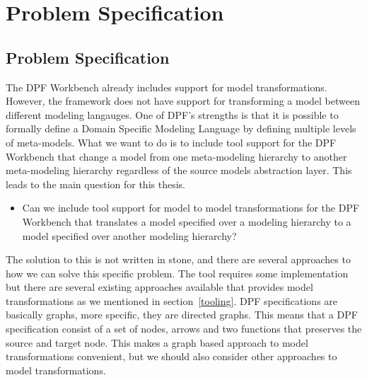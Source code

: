 
\chapter{Problem Specification} %

\label{Chapter4} %



\section{Problem Specification}
\label{problem}

The DPF Workbench already includes support for model transformations. However,
the framework does not have support for transforming a model between different
modeling langauges. One of DPF's strengths is that it is possible to formally
define a Domain Specific Modeling Language by defining multiple levels of
meta-models. What we want to do is to include tool support for the DPF Workbench
that change a model from one meta-modeling hierarchy to another meta-modeling
hierarchy regardless of the source models abstraction layer. This leads to the
main question for this thesis.

\begin{itemize}
  
  \item Can we include tool support for model to model transformations for the
  DPF Workbench that translates a model specified over a modeling hierarchy to a
  model specified over another modeling hierarchy?

\end{itemize}

The solution to this is not written in stone, and there are several approaches
to how we can solve this specific problem. The tool requires some implementation
but there are several existing approaches available that provides model
transformations as we mentioned in section~\ref{tooling}. DPF specifications are
basically graphs, more specific, they are directed graphs. This means that a
DPF specification consist of a set of nodes, arrows and two functions that
preserves the source and target node. This makes a graph based approach to model
transformations convenient, but we should also consider other approaches to
model transformations. 

